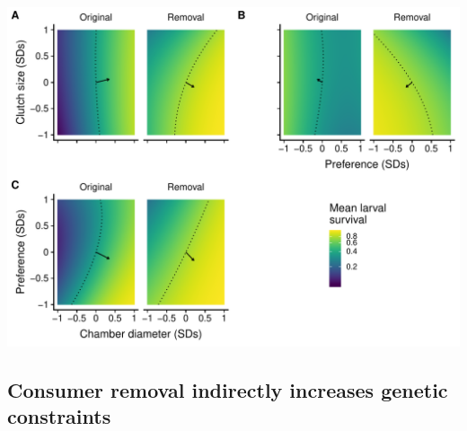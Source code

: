 \documentclass[11pt,]{article}
\let\origfigure\figure
\let\endorigfigure\endfigure
\renewenvironment{figure}[1][2] {
    \expandafter\origfigure\expandafter[H]
} {
    \endorigfigure
}
\begin{document}
\begin{figure}
\centering
\includegraphics{../analyses/MV_landscapes.pdf}
\caption{\label{fig:MV_Landscape}Two dimensional view of adaptive
landscapes of gall midge phenotypes in the original food web and with
the removal of larval parasitoids. Each panel corresponds to a different
combination of phenotypic traits: clutch size and chamber diameter (A);
clutch size and oviposition preference (B); oviposition preference and
chamber diameter (C). Arrows represent mean estimates of directional
selection gradients, while contours represent predicted larval survival
of the mean phenotype in each food-web treatment. Notice that arrows
point more toward a corner of the adaptive landscape for each
combination of traits with the removal of larval parasitoids compared to
the original food web. This indicates that the removal of consumers more
strongly favored a specific combination of traits. Note that mean larval
survival is plotted on a natural log scale to reflect the mathematical
definition of the adaptive landscape.}
\end{figure}

\bigskip

\subsection{Consumer removal indirectly increases genetic
constraints}\label{consumer-removal-indirectly-increases-genetic-constraints}
\end{document}

